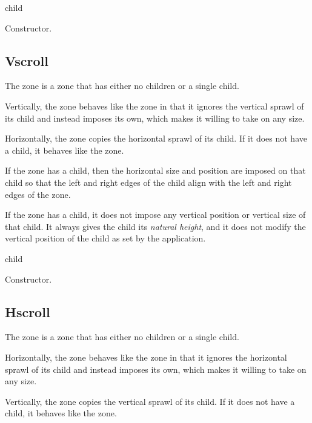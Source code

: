 

 {\optional child}

Constructor. 

\subsection{Vscroll}

The  zone is a zone that has either no children or a single
child.  

Vertically, the  zone behaves like the 
zone in that it ignores the vertical sprawl of its child and instead
imposes its own, which makes it willing to take on any size.  

Horizontally, the  zone copies the horizontal sprawl of
its child.  If it does not have a child, it behaves like the
 zone.  

If the  zone has a child, then the horizontal size and
position are imposed on that child so that the left and right edges of
the child align with the left and right edges of the 
zone.  

If the  zone has a child, it does not impose any vertical
position or vertical size of that child.  It always gives the child
its \emph{natural height}, and it does not modify the vertical
position of the child as set by the application.



 {\optional child}

Constructor. 

\subsection{Hscroll}


The  zone is a zone that has either no children or a single
child.  

Horizontally, the  zone behaves like the 
zone in that it ignores the horizontal sprawl of its child and instead
imposes its own, which makes it willing to take on any size.  

Vertically, the  zone copies the vertical sprawl of
its child.  If it does not have a child, it behaves like the
 zone.  

